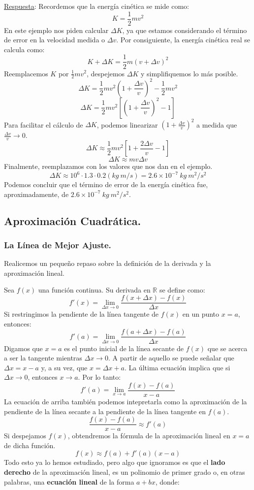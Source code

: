 \documentclass[12pt]{article}
\begin{document}
\underline{Respuesta}: Recordemos que la energía cinética se mide como:
\[K = \frac{1}{2} m v^{2}\]
En este ejemplo nos piden calcular $\Delta K$, ya que estamos considerando el término de error en la velocidad medida o $\Delta v$. Por consiguiente, la energía cinética real se calcula como:
\[K + \Delta K = \frac{1}{2} m (v + \Delta v)^{2}\]
Reemplacemos $K$ por $\frac{1}{2}mv^{2}$, despejemos $\Delta K$ y simplifiquemos lo más posible.
\[\Delta K = \frac{1}{2} mv^{2} \left(1 + \frac{\Delta v}{v}\right)^{2} - \frac{1}{2}mv^{2}\]
\[\Delta K = \frac{1}{2} mv^{2} \left[\left(1 + \frac{\Delta v}{v}\right)^{2} - 1\right]\]
Para facilitar el cálculo de $\Delta K$, podemos linearizar $\left(1 + \frac{\Delta v}{v}\right)^{2}$ a medida que $\frac{\Delta v}{v} \to 0$.
\[\Delta K \approx \frac{1}{2} mv^{2} \left[1 + \frac{2\Delta v}{v} - 1\right]\]
\[\Delta K \approx m v \Delta v\]
Finalmente, reemplazamos con los valores que nos dan en el ejemplo.
\[\Delta K \approx 10^{6} \cdot 1.3 \cdot 0.2 \left(kg \ m/s\right) = 2.6 \times 10^{-7} \ kg \ m^{2}/s^{2}\]
Podemos concluir que el término de error de la energía cinética fue, aproximadamente, de $2.6 \times 10^{-7} \ kg \ m^{2}/s^{2}$.

\newpage

\subsection{Aproximación Cuadrática.}

\subsubsection{La Línea de Mejor Ajuste.}

Realicemos un pequeño repaso sobre la definición de la derivada y la aproximación lineal.

Sea $f(x)$ una función continua. Su derivada en $\mathbb{R}$ se define como:
\[f'(x) = \lim_{\Delta x \to 0} \frac{f(x + \Delta x) - f(x)}{\Delta x}\]
Si restringimos la pendiente de la línea tangente de $f(x)$ en un punto $x = a$, entonces:
\[f'(a) = \lim_{\Delta x \to 0} \frac{f(a + \Delta x) - f(a)}{\Delta x}\]
Digamos que $x = a$ es el punto inicial de la línea secante de $f(x)$ que se acerca a ser la tangente mientras $\Delta x \to 0$. A partir de aquello se puede señalar que $\Delta x = x - a$ y, a su vez, que $x = \Delta x + a$. La última ecuación implica que si $\Delta x \to 0$, entonces $x \to a$. Por lo tanto:
\[f'(a) = \lim_{x \to a} \frac{f(x) - f(a)}{x - a}\]
La ecuación de arriba también podemos intepretarla como la aproximación de la pendiente de la línea secante a la pendiente de la línea tangente en $f(a)$.
\[\frac{f(x) - f(a)}{x - a} \approx f'(a)\]
Si despejamos $f(x)$, obtendremos la fórmula de la aproximación lineal en $x = a$ de dicha función.
\[f(x) \approx f(a) + f'(a)(x - a)\]
Todo esto ya lo hemos estudiado, pero algo que ignoramos es que el \textbf{lado derecho} de la aproximación lineal, es un polinomio de primer grado o, en otras palabras, una \textbf{ecuación lineal} de la forma $a + bx$, donde:
\end{document}
